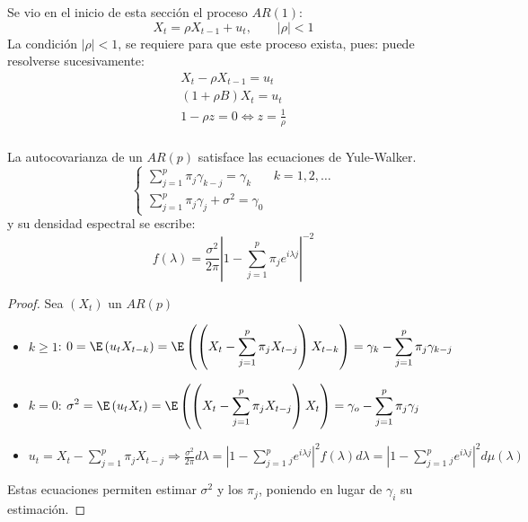 \begin{ejemplo}
 Se vio en el inicio de esta secci\'{o}n el proceso $AR(1)$:
\[
X_{t} =\rho X_{t-1} +u_{t} ,\qquad \left| \rho \right|<1
\]
La condici\'{o}n $\left| \rho \right|<1$, se requiere para que este proceso 
exista, pues:
puede resolverse sucesivamente:
\begin{gather*}
 X_{t} -\rho X_{t-1} =u_{t} \\ 
 \left( {1+\rho B} \right)X_{t} =u_{t} \\ 
 1-\rho z=0 \Longleftrightarrow z=\frac{1}{\rho } \\ 
\end{gather*}
\end{ejemplo}


\begin{teorema}
 La autocovarianza de un $AR(p)$ satisface las ecuaciones de Yule-Walker.
\[
\begin{cases}
 \displaystyle\sum_{j=1}^p {\pi_{j} \gamma_{k-j} } =\gamma_{k} & k=1,2,\ldots\\
 \displaystyle\sum_{j=1}^p {\pi_{j} \gamma_{j} +\sigma^{2}=\gamma_{0} }
\end{cases}
\]
y su densidad espectral se escribe:
\[
f\left( \lambda \right)=\frac{\sigma^{2}}{2\pi }\left| 
{1-\sum_{j=1}^p {\pi_{j} e^{i\lambda j}} } 
\right|^{-2}
\]
\end{teorema}


\begin{proof}
Sea $\left( {X_{t} } \right)$ un $AR (p)$
\begin{itemize}
\item $k\ge 1$: $\displaystyle 0=\E\left( {u_{t} X_{t-k} } \right)=\E\left( {\left( {X_{t} -\sum_{j=1}^p {\pi_{j} X_{t-j} } } \right)X_{t-k} } \right)=\gamma_{k} -\sum_{j=1}^p {\pi_{j} \gamma_{k-j} } $ 

\item $k=0$: $\displaystyle\sigma^{2}=\E\left( {u_{t} X_{t} } \right)=\E\left( {\left( {X_{t} -\sum_{j=1}^p {\pi_{j} X_{t-j} } } \right)X_{t} } \right)=\gamma_{o} -\sum_{j=1}^p {\pi_{j} \gamma_{j} } $

\item $\displaystyle u_{t} =X_{t} -\sum_{j=1}^p {\pi_{j} X_{t-j} \Rightarrow \frac{\sigma^{2}}{2\pi }d\lambda =\left| {1-\sum_{j=1}^p {_{j} e^{i\lambda j}} } \right|^{2}} f(\lambda )d\lambda =\left| {1-\sum_{j=1}^p {_{j} e^{i\lambda j}} } \right|^{2}d\mu \left( \lambda \right)$
\end{itemize}

Estas ecuaciones permiten estimar $\sigma^{2}$ y los $\pi_{j} $, poniendo 
en lugar de $\gamma_{i} $ su estimaci\'{o}n.
\end{proof}



